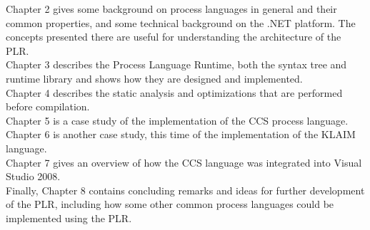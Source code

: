 	Chapter 2 gives some background on process languages in general and their 
	common properties, and some technical background on the .NET platform. The 
	concepts presented there are useful for understanding the architecture of 
	the PLR.\\
	Chapter 3 describes the Process Language Runtime, both the syntax tree and 
	runtime library and shows how they are designed and implemented. \\
	Chapter 4 describes the static analysis and optimizations that are performed
	before compilation.\\
	Chapter 5 is a case study of the implementation of the CCS process 
	language.\\
	Chapter 6 is another case study, this time of the implementation of the 
	KLAIM language.\\
	Chapter 7 gives an overview of how the CCS language was integrated into 
	Visual Studio 2008. \\
	Finally, Chapter 8 contains concluding remarks and ideas for further 
	development of the PLR, including how some other common process languages 	
	could be implemented using the PLR.\\

